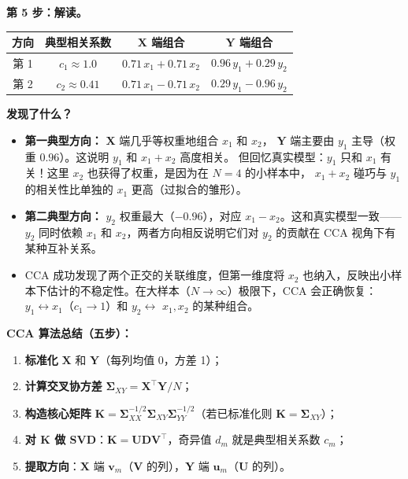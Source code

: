 \medskip
\noindent
\textbf{第 5 步：解读。}

\begin{center}
\renewcommand{\arraystretch}{1.4}
\begin{tabular}{c|c|c|c}
\toprule
\textbf{方向} & \textbf{典型相关系数} & $\mathbf{X}$ 端组合 & $\mathbf{Y}$ 端组合 \\
\midrule
第 1 & $c_1 \approx 1.0$ & $0.71\,x_1 + 0.71\,x_2$ & $0.96\,y_1 + 0.29\,y_2$ \\
第 2 & $c_2 \approx 0.41$ & $0.71\,x_1 - 0.71\,x_2$ & $0.29\,y_1 - 0.96\,y_2$ \\
\bottomrule
\end{tabular}
\end{center}

\textbf{发现了什么？}
\begin{itemize}
    \item \textbf{第一典型方向：} $\mathbf{X}$ 端几乎等权重地组合 $x_1$ 和 $x_2$，
    $\mathbf{Y}$ 端主要由 $y_1$ 主导（权重 $0.96$）。这说明 $y_1$ 和 $x_1+x_2$ 高度相关。
    但回忆真实模型：$y_1$ 只和 $x_1$ 有关！这里 $x_2$ 也获得了权重，是因为在 $N=4$ 的小样本中，
    $x_1+x_2$ 碰巧与 $y_1$ 的相关性比单独的 $x_1$ 更高（过拟合的雏形）。

    \item \textbf{第二典型方向：} $y_2$ 权重最大（$-0.96$），对应 $x_1 - x_2$。这和真实模型一致——$y_2$ 同时依赖 $x_1$ 和 $x_2$，两者方向相反说明它们对 $y_2$ 的贡献在 CCA 视角下有某种互补关系。

    \item CCA 成功发现了两个正交的关联维度，但第一维度将 $x_2$ 也纳入，反映出小样本下估计的不稳定性。在大样本（$N \to \infty$）极限下，CCA 会正确恢复：$y_1 \leftrightarrow x_1$（$c_1 \to 1$）和 $y_2 \leftrightarrow$ $x_1, x_2$ 的某种组合。
\end{itemize}

\medskip
\noindent
\textbf{CCA 算法总结（五步）：}

\begin{enumerate}[label=第 \arabic* 步：, leftmargin=*]
    \item \textbf{标准化} $\mathbf{X}$ 和 $\mathbf{Y}$（每列均值 0，方差 1）；
    \item \textbf{计算交叉协方差} $\bm{\Sigma}_{XY} = \mathbf{X}^\top \mathbf{Y} / N$；
    \item \textbf{构造核心矩阵} $\mathbf{K} = \bm{\Sigma}_{XX}^{-1/2} \bm{\Sigma}_{XY} \bm{\Sigma}_{YY}^{-1/2}$（若已标准化则 $\mathbf{K} = \bm{\Sigma}_{XY}$）；
    \item \textbf{对 $\mathbf{K}$ 做 SVD}：$\mathbf{K} = \mathbf{U} \mathbf{D} \mathbf{V}^\top$，奇异值 $d_m$ 就是典型相关系数 $c_m$；
    \item \textbf{提取方向}：$\mathbf{X}$ 端 $\mathbf{v}_m$（$\mathbf{V}$ 的列），$\mathbf{Y}$ 端 $\mathbf{u}_m$（$\mathbf{U}$ 的列）。
\end{enumerate}

